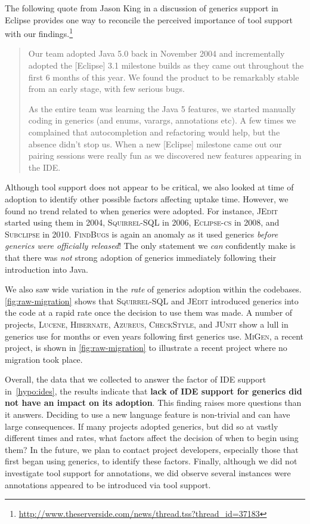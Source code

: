 \documentclass{svjour3}
\newcommand{\squirrelsql}{\textsc{Squirrel-SQL}\xspace}
\newcommand{\eclipsecs}{\textsc{Eclipse-cs}\xspace}
\newcommand{\azureus}{\textsc{Azureus}\xspace}
\newcommand{\jedit}{\textsc{JEdit}\xspace}
\newcommand{\junit}{\textsc{JUnit}\xspace}
\newcommand{\lucene}{\textsc{Lucene}\xspace}
\newcommand{\hibernate}{\textsc{Hibernate}\xspace}
\newcommand{\findbugs}{\textsc{FindBugs}\xspace}
\newcommand{\checkstyle}{\textsc{CheckStyle}\xspace}
\newcommand{\subclipse}{\textsc{Subclipse}\xspace}
\newcommand{\migen}{\textsc{MiGen}\xspace}
\begin{document}
The following quote from Jason
King in a discussion of generics support in Eclipse
provides one way to reconcile the perceived importance of tool support with 
our findings.\footnote{\scriptsize{\url{http://www.theserverside.com/news/thread.tss?thread_id=37183}}}

\begin{quote}
Our team adopted Java 5.0 back in November 2004 and incrementally adopted the
[Eclipse] 3.1 milestone builds as they came out throughout the first 6 months of this
year. We found the product to be remarkably stable from an early stage, with
few serious bugs.

As the entire team was learning the Java 5 features, we started manually coding
in generics (and enums, varargs, annotations etc). A few times we complained
that autocompletion and refactoring would help, but the absence didn't stop us.
When a new [Eclipse] milestone came out our pairing sessions were really fun as we
discovered new features appearing in the IDE.
\end{quote}

Although tool support does not appear to be critical, we also looked at
time of adoption to identify other possible factors affecting
uptake time.  
However, we found no trend related to when generics were adopted.
For instance, \jedit started using them
in 2004, \squirrelsql in 2006, \eclipsecs in 2008, and \subclipse in 2010.
\findbugs is again an anomaly as it used generics \emph{before generics were officially
released}!  The only statement we \emph{can} confidently make is that there was
\emph{not} strong adoption of generics immediately following their introduction
into Java.

We also saw wide variation in the \emph{rate}
of generics adoption within the codebases.  \autoref{fig:raw-migration} shows that
\squirrelsql and \jedit introduced generics into the code at a rapid
rate once the decision to use them was made.  
A number of projects, 
\lucene, \hibernate, \azureus, \checkstyle, and \junit show a lull in generics use
for months or even years following first generics use.  
\migen, a recent project, is shown in \autoref{fig:raw-migration} 
to illustrate a recent project where no migration took place.

Overall, the data that we collected to answer the factor of IDE support in~\autoref{hypo:ides}, 
the results indicate that \textbf{lack of IDE support for generics
did not have an impact on its adoption}.  This
finding raises more questions than it answers.  Deciding to use a new language
feature is non-trivial and can have large consequences.  If many projects
adopted generics, but did so at vastly different times and rates, what factors
affect the decision of when to begin using them?  In the future, we plan to
contact project developers, especially those that first began using generics,
to identify these factors.  Finally, although we did not investigate tool support for annotations, we did observe several instances were annotations appeared to be introduced via tool support.
\end{document}
